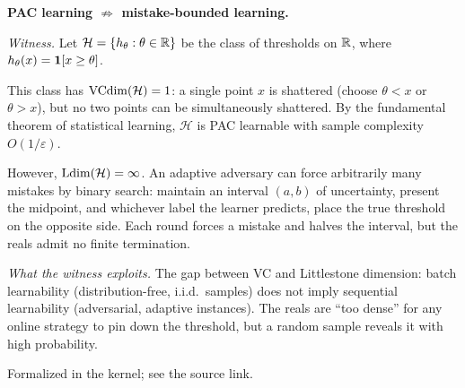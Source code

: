
\begin{separation}
\textbf{PAC learning $\not\Rightarrow$ mistake-bounded learning.}

\medskip\noindent
\emph{Witness.}
Let $\mathcal{H} = \{h_\theta : \theta \in \mathbb{R}\}$ be the class of
thresholds on $\mathbb{R}$, where $h_\theta(x) = \mathbf{1}[x \geq \theta]$.

This class has $\mathrm{VCdim}(\mathcal{H}) = 1$: a single point $x$ is shattered
(choose $\theta < x$ or $\theta > x$), but no two points can be
simultaneously shattered. By the fundamental theorem of statistical
learning, $\mathcal{H}$ is PAC learnable with sample complexity
$O(1/\varepsilon)$.

However, $\mathrm{Ldim}(\mathcal{H}) = \infty$. An adaptive adversary can force
arbitrarily many mistakes by binary search: maintain an interval
$(a, b)$ of uncertainty, present the midpoint, and whichever label the
learner predicts, place the true threshold on the opposite side. Each
round forces a mistake and halves the interval, but the reals admit
no finite termination.

\medskip\noindent
\emph{What the witness exploits.}
The gap between VC and Littlestone dimension: batch learnability
(distribution-free, i.i.d.\ samples) does not imply sequential
learnability (adversarial, adaptive instances). The reals are
``too dense'' for any online strategy to pin down the threshold,
but a random sample reveals it with high probability.

\hfill\cite{Littlestone1988}
\end{separation}

\begin{remark}\label{sep:pac-not-online}
  \leanok
  Formalized in the kernel; see the source link.
\end{remark}



